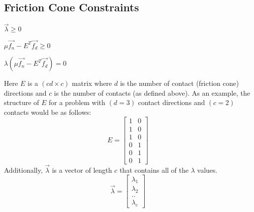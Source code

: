{\subsection{Friction Cone Constraints}
\begin{packed_item}
\item $\vec{\lambda} \geq 0$
\item $\mu\vec{f_n} - E^T\vec{f_d} \geq 0$
\item $\lambda(\mu\vec{f_n} - E^T\vec{f_d}) = 0$
\end{packed_item}
Here $E$ is a $(cd \times c)$ matrix where $d$ is the number of contact (friction cone) directions and $c$ is the number of contacts (as defined above). As an example, the structure of $E$ for a problem with $(d = 3)$ contact directions and $(c = 2)$ contacts would be as follows:
\begin{equation}
\label{eq:ematrix}
E = \left[\begin{matrix}1 & 0 \\ 1 & 0 \\ 1 & 0 \\ 0 & 1 \\ 0 & 1 \\ 0 & 1\end{matrix}\right]
\end{equation}
Additionally, $\vec{\lambda}$ is a vector of length $c$ that contains all of the $\lambda$ values.
\begin{equation}
\label{eq:lambda}
\vec{\lambda} = \left[\begin{matrix}\lambda_1 \\ \lambda_2 \\ .. \\ \lambda_c\end{matrix}\right]
\end{equation}

}
